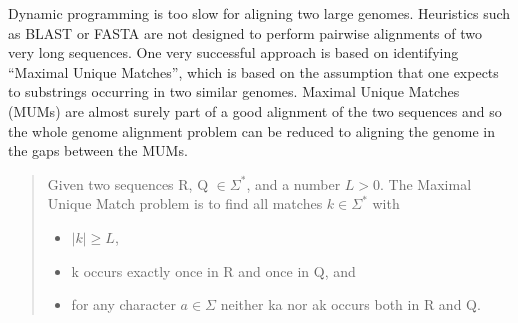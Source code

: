 \documentclass[runningheads,a4paper]{llncs}
\begin{document}
{Dynamic programming is too slow for aligning two large genomes. Heuristics such as BLAST \cite{Blast} or FASTA \cite{Fasta} are not designed to perform pairwise alignments of two very long sequences. One very successful approach is based on identifying ``Maximal Unique Matches'', which is based on the assumption that one expects to substrings occurring in two similar genomes. Maximal Unique Matches (MUMs) are almost surely part of a good alignment of the two sequences and so the whole genome alignment problem can be reduced to aligning the genome in the gaps between the MUMs.\\
\begin{quote}
  Given two sequences R, Q $\in \Sigma^*$, and a number $L > 0$. The Maximal Unique Match problem is to find all matches $k \in \Sigma^*$ with
  \begin{itemize}
    \item $|k|\geq L$,
    \item k occurs exactly once in R and once in Q, and
    \item for any character $a \in \Sigma$ neither ka nor ak occurs both in R and Q.
  \end{itemize}
\end{quote}
}
\end{document}
